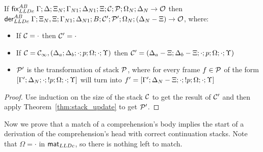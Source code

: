 \begin{theorem}\label{thm:from_update_to_derivation}
If $\mathsf{fix}_{LLDc}^{AB} \; \Gamma; \Delta; \Xi_N; \Gamma_{N1}; \Delta_{N1}; \Xi; \mathcal{C};
\mathcal{P}; \Omega_N; \Delta_N \rightarrow \mathcal{O}$ then\\
\texttab$\mathsf{der}_{LLDc}^{AB} \; \Gamma; \Xi_N, \Xi;
\Gamma_{N1}; \Delta_{N1}; B; \mathcal{C'} ; \mathcal{P'}; \Omega_N; (\Delta_N - \Xi) \rightarrow
\mathcal{O}$, where:

\begin{itemize}[leftmargin=*]
   \item If $\mathcal{C} = \cdot$ then $\mathcal{C'} = \cdot$

   \item If $\mathcal{C} = \mathcal{C_1}, (\Delta_a; \Delta_b; \cdot; p; \Omega; \cdot; \Upsilon)$
   then $\mathcal{C'} = (\Delta_a - \Xi; \Delta_b - \Xi; \cdot; p; \Omega; \cdot;
         \Upsilon)$

   \item $\mathcal{P'}$ is the transformation of stack $\mathcal{P}$, where for every frame $f \in
   \mathcal{P}$ of the form $[\Gamma'; \Delta_N; \cdot; {!} p; \Omega; \cdot; \Upsilon]$
   will turn into $f' = [\Gamma';\Delta_N-\Xi;\cdot;{!} p;\Omega;\cdot;\Upsilon]$

\end{itemize}
\end{theorem}
\begin{proof}
Use induction on the size of the stack $\mathcal{C}$ to get the result of
$\mathcal{C'}$ and then
apply Theorem~\ref{thm:stack_update} to get $\mathcal{P'}$.
\end{proof}


Now we prove that a match of a comprehension's body implies the start of a
derivation of the comprehension's head with correct continuation stacks. Note
that $\Omega = \cdot$ in $\mathsf{mat}_{LLDc}$, so there is nothing left to match.

